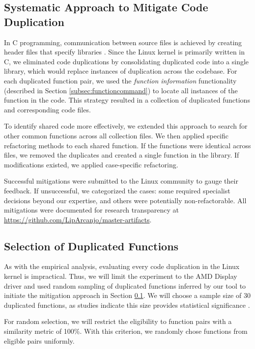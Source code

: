 \subsection{Systematic Approach to Mitigate Code Duplication}
\label{subsec:pipeline}

In C programming, communication between source files is achieved by creating header files that specify libraries \citep{Cbook}. Since the Linux kernel is primarily written in C, we eliminated code duplications by consolidating duplicated code into a single library, which would replace instances of duplication across the codebase.
%
For each duplicated function pair, we used the \textit{function information} functionality (described in Section \ref{subsec:functioncommand}) to locate all instances of the function in the code. This strategy resulted in a collection of duplicated functions and corresponding code files.

To identify shared code more effectively, we extended this approach to search for other common functions across all collection files. We then applied specific refactoring methods to each shared function. If the functions were identical across files, we removed the duplicates and created a single function in the library. If modifications existed, we applied case-specific refactoring.

Successful mitigations were submitted to the Linux community to gauge their feedback. If unsuccessful, we categorized the cases: some required specialist decisions beyond our expertise, and others were potentially non-refactorable. All mitigations were documented for research transparency at \url{https://github.com/LipArcanjo/master-artifacts}.

\subsection{Selection of Duplicated Functions}

As with the empirical analysis, evaluating every code duplication in the Linux kernel is impractical. 
Thus, we will limit the experiment to the AMD Display driver and used random sampling of duplicated functions
inferred by our tool to initiate the mitigation approach in Section \ref{subsec:pipeline}. 
We will choose a sample size of 30 duplicated functions, as studies indicate this size provides 
statistical significance \citep{sample1, sample2}.

For random selection, we will restrict the eligibility to function pairs with a similarity metric of 100\%. 
With this criterion, we randomly chose functions from eligible pairs uniformly.

